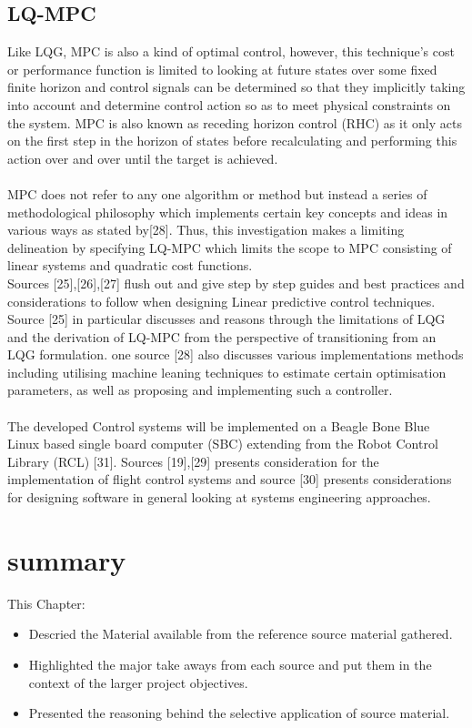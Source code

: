 \documentclass[12pt,a4paper,twoside]{report}
\begin{document}
			\subsection{LQ-MPC}
				Like LQG, MPC is also a kind of optimal control, however, this technique’s cost or performance function is limited to looking at future states over some fixed finite horizon and control signals can be determined so that they implicitly taking into account and determine control action so as to meet physical constraints on the system. MPC is also known as receding horizon control (RHC) as it only acts on the first step in the horizon of states before recalculating and performing this action over and over until the target is achieved.
				\\ \\
				MPC does not refer to any one algorithm or method but instead a series of methodological philosophy which implements certain key concepts and ideas in various ways as stated by[28]. Thus, this investigation makes a limiting delineation by specifying LQ-MPC which limits the scope to MPC consisting of linear systems and quadratic cost functions.
				\\
				Sources [25],[26],[27] flush out and give step by step guides and best practices and considerations to follow when designing Linear predictive control techniques. Source [25] in particular discusses and reasons through the limitations of LQG and the derivation of LQ-MPC from the perspective of transitioning from an LQG formulation. one source [28] also discusses various implementations methods including utilising machine leaning techniques to estimate certain optimisation parameters, as well as proposing and implementing such a controller.
				\\ \\
				The developed Control systems will be implemented on a Beagle Bone Blue Linux based single board computer (SBC) extending from the Robot Control Library (RCL) [31]. Sources [19],[29] presents consideration for the implementation of flight control systems and source [30] presents considerations for designing software in general looking at systems engineering approaches.
			
			\section{summary}	
			
				This Chapter:
				\\
				\begin{itemize}
					\item 
						Descried the Material available from the reference source material gathered.
					\item 
						Highlighted the major take aways from each source and put them in the context of the larger project objectives.
					\item
						Presented the reasoning behind the selective application of source material.
				\end{itemize}
		
\end{document}
